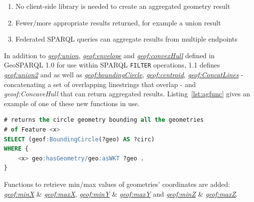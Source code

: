 \documentclass[runningheads]{llncs}
\begin{document}
\begin{enumerate}
    \item No client-side library is needed to create an aggregated geometry result
    \item Fewer/more appropriate results returned, for example a union result
    \item Federated SPARQL queries can aggregate results from multiple endpoints
\end{enumerate}

In addition to \href{http://www.opengis.net/def/function/geosparql/union}{\emph{geof:union}}, \href{http://www.opengis.net/def/function/geosparql/envelope}{\emph{geof:envelope}} and \href{http://www.opengis.net/def/function/geosparql/convexHull}{\emph{geof:convexHull}} defined in GeoSPARQL 1.0 
for use within SPARQL \texttt{FILTER} operations, 1.1 defines \href{http://www.opengis.net/def/function/geosparql/union2}{\emph{geof:union2}} and 
as well as \href{http://www.opengis.net/def/function/geosparql/boundingCircle}{\emph{geof:boundingCircle}}, \href{http://www.opengis.net/def/function/geosparql/centroid}{\emph{geof:centroid}}, \href{http://www.opengis.net/def/function/geosparql/concatLines}{\emph{geof:ConcatLines}} - concatenating a set of overlapping linestrings 
that overlap - and \emph{geosf:ConcaveHull} that can return aggregated results. Listing~\ref{lst:agfunc} gives an example 
of one of these new functions in use.

\small
\begin{lstlisting}[caption=Aggregation Function example SPARQL query,label=lst:agfunc,language=sql,frame=single,basicstyle=\ttfamily,showstringspaces=false]
# returns the circle geometry bounding all the geometries 
# of Feature <x>
SELECT (geof:BoundingCircle(?geo) AS ?circ)
WHERE {
    <x> geo:hasGeometry/geo:asWKT ?geo .
}
\end{lstlisting}
\normalsize

Functions to retrieve min/max values of geometries' coordinates are added: \href{http://www.opengis.net/def/function/geosparql/minX}{\emph{geof:minX}} \& \href{http://www.opengis.net/def/function/geosparql/maxX}{\emph{geof:maxX}},
\href{http://www.opengis.net/def/function/geosparql/minY}{\emph{geof:minY}} \& \href{http://www.opengis.net/def/function/geosparql/maxY}{\emph{geof:maxY}} and \href{http://www.opengis.net/def/function/geosparql/minZ}{\emph{geof:minZ}} \& \href{http://www.opengis.net/def/function/geosparql/maxZ}{\emph{geof:maxZ}}.
\end{document}
